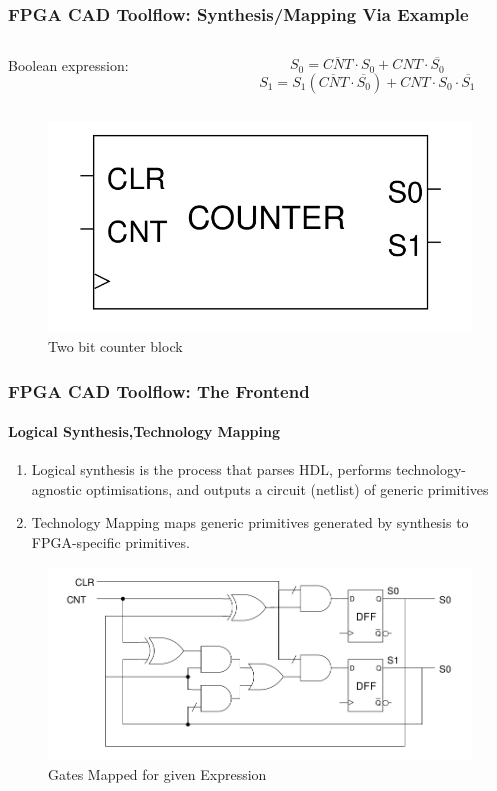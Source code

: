 \documentclass{beamer}
\begin{document}
{\begin{frame}[fragile]
  \frametitle{FPGA CAD Toolflow: Synthesis/Mapping Via Example}
  \begin{columns}
   \begin{column}{0.5\textwidth}
     Boolean expression:
    \end{column}
   \begin{column}{0.5\textwidth}		
     \[{S}_0 = \overline{CNT}\cdot{S}_0+ CNT \cdot \overline{{S}_0} \]
     \[{S}_1  ={S}_1 (\overline{CNT} \cdot\overline{{S}_0}) + CNT\cdot{S}_0\cdot\overline{{S}_1} \]
   \end{column}
   \end{columns}
   \begin{figure}[h]
       \centering
       \includegraphics[width=0.45\linewidth]{images/basic_block.png} 
       \caption{Two bit counter block}
       \label{exa_block}
    \end{figure}
\end{frame}


\begin{frame}[fragile]
    \frametitle{FPGA CAD Toolflow: The Frontend}
    \framesubtitle{Logical Synthesis,Technology Mapping}
    \begin{enumerate}
      \item Logical synthesis is the process that parses HDL, performs
        technology-agnostic optimisations, and outputs a circuit (netlist)
        of generic primitives
      \item Technology Mapping maps generic primitives generated by synthesis to
        FPGA-specific primitives. 
    \end{enumerate}
    \begin{figure}
        \includegraphics[width=0.5\linewidth]{images/netlist_gate.png}
        \caption{Gates Mapped for given Expression}
        \label{exa_mapgate}
    \end{figure}


\end{frame}}
\end{document}
